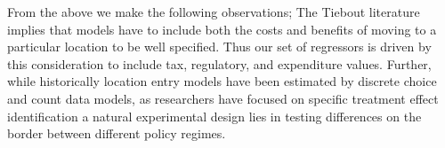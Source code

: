 From the above we make the following observations; The Tiebout literature implies that models have to include both the costs and benefits of moving to a particular location to be well specified. Thus our set of regressors is driven by this consideration to include tax, regulatory, and expenditure values. Further, while historically location entry models have been estimated by discrete choice and count data models, as researchers have focused on specific treatment effect identification a natural experimental design lies in testing differences on the border between different policy regimes.